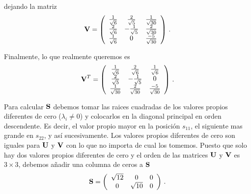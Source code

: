 \documentclass[
]{agujournal2019}
\begin{document}
dejando la matriz \[{\textbf V}=\left(\begin{array}{ccc}
  \frac{1}{\sqrt{6}} & \frac{2}{\sqrt{5}} & \frac{1}{\sqrt{30}}\\
  \frac{2}{\sqrt{6}} & -\frac{1}{\sqrt{5}} & \frac{2}{\sqrt{30}}\\
  \frac{1}{\sqrt{6}} & 0 & \frac{-5}{\sqrt{30}}
      \end{array}\right)\,.\]

Finalmente, lo que realmente queremos es
\[{\textbf V}^T=\left(\begin{array}{ccc}
  \frac{1}{\sqrt{6}} & \frac{2}{\sqrt{6}} & \frac{1}{\sqrt{6}}\\
  \frac{2}{\sqrt{5}} & -\frac{1}{\sqrt{5}} & 0\\
  \frac{1}{\sqrt{30}} & \frac{2}{\sqrt{30}} & \frac{-5}{\sqrt{30}}\\
      \end{array}\right)\,.\]

Para calcular \({\textbf S}\) debemos tomar las raices cuadradas de los
valores propios diferentes de cero (\(\lambda_i\ne0\)) y colocarlos en
la diagonal principal en orden descendente. Es decir, el valor propio
mayor en la posición \(s_{11}\), el siguiente mas grande en \(s_{22}\),
y así sucesivamente. Los valores propios diferentes de cero son iguales
para \({\textbf U}\) y \({\textbf V}\) con lo que no importa de cual los
tomemos. Puesto que solo hay dos valores propios diferentes de cero y el
orden de las matrices \({\textbf U}\) y \({\textbf V}\) es \(3\times3\),
debemos añadir una columna de ceros a \({\textbf S}\)
\[{\textbf S}=\left(\begin{array}{ccc}
  \sqrt{12} & 0 & 0 \\
  0 & \sqrt{10} & 0\\
      \end{array}\right)\,.\]
\end{document}
